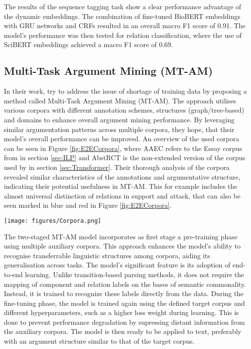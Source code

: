 The results of the sequence tagging task show a clear performance advantage of the dynamic embeddings. The combination of fine-tuned BioBERT embeddings with GRU networks and CRFs resulted in an overall macro F1 score of 0.91. The model's performance was then tested for relation classification, where the use of SciBERT embeddings achieved a macro F1 score of 0.69.

\subsection{Multi-Task Argument Mining (\textbf{MT-AM})}
In their work, \textcite{EndToEndAM} try to address the issue of shortage of training data by proposing a method called Multi-Task Argument Mining (MT-AM). The approach utilises various corpora with different annotation schemes, structures (graph/tree-based) and domains to enhance overall argument mining performance. By leveraging similar argumentation patterns across multiple corpora, they hope, that their model's overall performance can be improved. An overview of the used corpora can be seen in Figure \ref{fig:E2ECorpora}, where AAEC refers to the Essay corpus from \textcite{ParsingArgumentationStructures} in section \ref{sec:ILP} and AbstRCT is the non-extended version of the corpus used by \textcite{TransformerHealthcareAM} in section \ref{sec:Transformer}. Their thorough analysis of the corpora revealed similar characteristics of the annotations and argumentative structure, indicating their potential usefulness in MT-AM. This for example includes the almost universal distinction of relations in support and attack, that can also be seen marked in blue and red in Figure \ref{fig:E2ECorpora}.
\begin{figure*}
    \centering
    \texttt{[image: figures/Corpora.png]}
    \caption{A table of the various corpora used by \textcite{EndToEndAM}}
    \label{fig:E2ECorpora}
\end{figure*}

The two-staged MT-AM model incorporates as first stage a pre-training phase using multiple auxiliary corpora. This approach enhances the model's ability to recognise transferrable linguistic structures among corpora, aiding its generalisation across tasks. The model's significant feature is its adoption of end-to-end learning. Unlike transition-based parsing methods, it does not require the mapping of component and relation labels on the bases of semantic commonality. Instead, it is trained to recognize these labels directly from the data. During the fine-tuning phase, the model is trained again using the defined target corpus and different hyperparameters, such as a higher loss weight during learning. This is done to prevent performance degradation by supressing distant information from the auxiliary corpora. The model is then ready to be applied to text, preferably with an argument structure similar to that of the target corpus.

